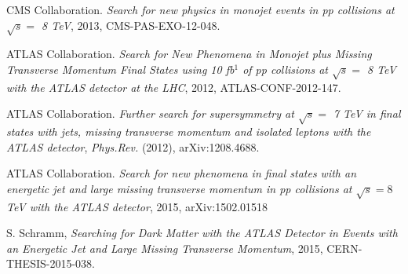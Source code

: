 CMS Collaboration. \emph{Search for new physics in monojet events in pp collisions at $\sqrt{s} =$ 8 TeV}, 2013, CMS-PAS-EXO-12-048.

ATLAS Collaboration. \emph{Search for New Phenomena in Monojet plus Missing Transverse Momentum Final States using 10 fb$^{1}$ of pp collisions at $\sqrt{s} =$ 8 TeV with the ATLAS detector at the LHC}, 2012, ATLAS-CONF-2012-147.

ATLAS Collaboration. \emph{Further search for supersymmetry at $\sqrt{s} =$ 7 TeV in final states with jets, missing transverse momentum and isolated leptons with the ATLAS detector}, \emph{Phys.Rev.} (2012), arXiv:1208.4688.

ATLAS Collaboration. \emph{Search for new phenomena in final states with an energetic jet and large missing transverse momentum in pp collisions at $\sqrt{s}=8$ TeV with the ATLAS detector}, 2015, arXiv:1502.01518

S. Schramm, \emph{Searching for Dark Matter with the ATLAS Detector in Events with an Energetic Jet and Large Missing Transverse Momentum}, 2015, CERN-THESIS-2015-038.



